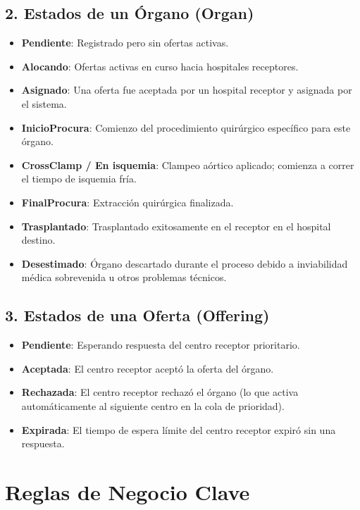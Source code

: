 \documentclass[11pt, a4paper]{article}
\begin{document}
\subsection{2. Estados de un Órgano (Organ)}
\begin{itemize}
    \item \textbf{Pendiente}: Registrado pero sin ofertas activas.
    \item \textbf{Alocando}: Ofertas activas en curso hacia hospitales receptores.
    \item \textbf{Asignado}: Una oferta fue aceptada por un hospital receptor y asignada por el sistema.
    \item \textbf{InicioProcura}: Comienzo del procedimiento quirúrgico específico para este órgano.
    \item \textbf{CrossClamp / En isquemia}: Clampeo aórtico aplicado; comienza a correr el tiempo de isquemia fría.
    \item \textbf{FinalProcura}: Extracción quirúrgica finalizada.
    \item \textbf{Trasplantado}: Trasplantado exitosamente en el receptor en el hospital destino.
    \item \textbf{Desestimado}: Órgano descartado durante el proceso debido a inviabilidad médica sobrevenida u otros problemas técnicos.
\end{itemize}

\subsection{3. Estados de una Oferta (Offering)}
\begin{itemize}
    \item \textbf{Pendiente}: Esperando respuesta del centro receptor prioritario.
    \item \textbf{Aceptada}: El centro receptor aceptó la oferta del órgano.
    \item \textbf{Rechazada}: El centro receptor rechazó el órgano (lo que activa automáticamente al siguiente centro en la cola de prioridad).
    \item \textbf{Expirada}: El tiempo de espera límite del centro receptor expiró sin una respuesta.
\end{itemize}

\newpage

\section{Reglas de Negocio Clave}
\end{document}
